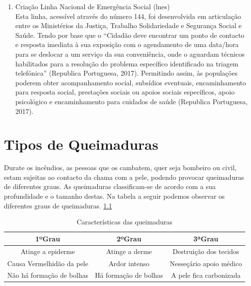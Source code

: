 \documentclass{report}
\begin{document}
\begin{enumerate}
\begin{itemize}
 \end{itemize}
 
 \item Criação Linha Nacional de Emergência Social (\ac{lnes})\\
  Esta linha, acessível através do número 144, foi desenvolvida em articulação entre os Ministérios da Justiça, Trabalho Solidariedade e Segurança Social e Saúde. Tendo por base que o “Cidadão deve encontrar um ponto de contacto e resposta imediata à sua exposição com o agendamento de uma data/hora para se deslocar a um serviço da sua conveniência, onde o aguardam técnicos habilitados para a resolução do problema específico identificado na triagem telefónica” (Republica Portuguesa, 2017). Permitindo assim, às populações poderem obter acompanhamento social, subsídios eventuais, encaminhamento para resposta social, prestações sociais ou apoios sociais específicos, apoio psicológico e encaminhamento para cuidados de saúde (Republica Portuguesa, 2017).


 \end{enumerate}

 
\chapter{Tipos de Queimaduras} 
\label{tipos de queimaduras}
\cite{dgsriscos}

Durate os incêndios, as pessoas que os cambatem, quer seja bombeiro ou civil,  estam sujeitas ao contacto da chama com a pele, podendo provocar queimaduras de diferentes graus.
As queimaduras classificam-se de acordo com a sua profundidade e o tamanho destas.
Na tabela a seguir podemos observar os diferentes graus de queimaduras. \ref{tab2}


\begin{table}
\caption{Características das queimaduras}
\centering
\begin{tabular}{|c||c||c|}
\hline  
   \textbf{1ºGrau}	  	&  \textbf{2ºGrau}	  &  \textbf{3ªGrau}		 \\  \hline
   Atinge a epiderme		&  Atinge a derme         &  Destruição dos tecidos \\  \hline
   Causa Vermelhidão da pele   	&  Ardor intenso	  &  Nesseçário apoio médico \\  \hline
   Não há formação de bolhas    &  Há formação de bolhas  &  A pele fica carbonizada \\  \hline
\end{tabular}
\label{tab2}
\end{table}
 
\end{document}

